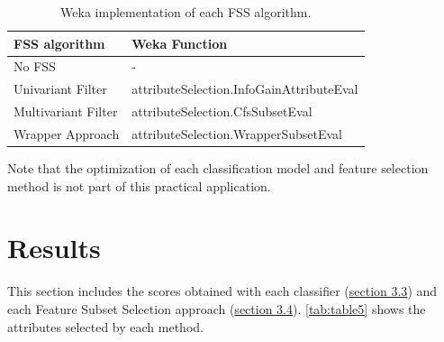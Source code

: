 \documentclass[a4paper,11pt]{article}
\begin{document}
\begin{table}[h]
\centering
\begin{tabular}{||l|l||}
	\hline
	FSS algorithm & Weka Function\\
	\hline
	No FSS & -\\
	Univariant Filter & attributeSelection.InfoGainAttributeEval\\
	Multivariant Filter & attributeSelection.CfsSubsetEval\\
	Wrapper Approach & attributeSelection.WrapperSubsetEval\\
	\hline
\end{tabular}
\caption{Weka implementation of each FSS algorithm.}
\label{tab:table4}
\end{table}

Note that the optimization of each classification model and feature selection method is not part of this practical application.

\section{Results}
\label{sec:results}

This section includes the scores obtained with each classifier (\hyperref[subsec:algorithms]{section 3.3}) and each Feature Subset Selection approach (\hyperref[subsec:fss]{section 3.4}). \autoref{tab:table5} shows the attributes selected by each method.
\end{document}
